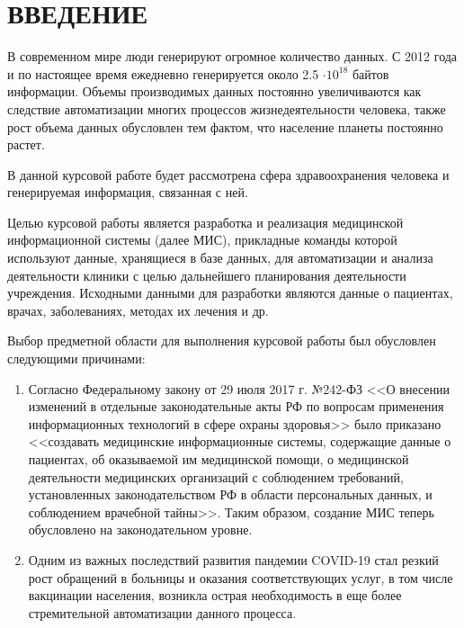 \chapter*{ВВЕДЕНИЕ}

В современном мире люди генерируют огромное количество данных. С 2012 года и по настоящее время ежедневно генерируется около 2.5 $\cdot 10^{18}$ байтов информации\cite{stat}. Объемы производимых данных постоянно увеличиваются как следствие автоматизации многих процессов жизнедеятельности человека, также рост объема данных обусловлен тем фактом, что население планеты постоянно растет.

В данной курсовой работе будет рассмотрена сфера здравоохранения человека и генерируемая информация, связанная с ней. 

Целью курсовой работы является разработка и реализация медицинской информационной системы (далее МИС), прикладные команды которой используют данные, хранящиеся в базе данных, для автоматизации и анализа деятельности клиники с целью дальнейшего планирования деятельности учреждения. Исходными данными для разработки являются данные о пациентах, врачах, заболеваниях, методах их лечения и др.

Выбор предметной области для выполнения курсовой работы был обусловлен следующими причинами:

\begin{enumerate}
	\item Согласно Федеральному закону от 29 июля 2017 г. №242-ФЗ <<О внесении изменений в отдельные законодательные акты РФ по вопросам применения информационных технологий в сфере охраны здоровья>> было приказано <<создавать медицинские информационные системы, содержащие данные о пациентах, об оказываемой им медицинской помощи, о медицинской деятельности медицинских организаций с соблюдением требований, установленных законодательством РФ в области персональных данных, и соблюдением врачебной тайны>>. Таким образом, создание МИС теперь обусловлено на законодательном уровне.
	\item Одним из важных последствий развития пандемии COVID-19 стал резкий рост обращений в больницы и оказания соответствующих услуг, в том числе вакцинации населения, возникла острая необходимость в еще более стремительной автоматизации данного процесса.
\end{enumerate}


\clearpage


